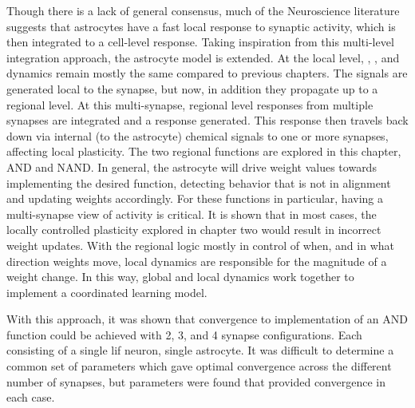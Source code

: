 Though there is a lack of general consensus, much of the Neuroscience literature
suggests that astrocytes have a fast local response to synaptic activity, which
is then integrated to a cell-level response. Taking inspiration from this
multi-level integration approach, the astrocyte model is extended. At the local
level, \ipt, \kp, and \ca dynamics remain mostly the same compared to previous
chapters. The \ca signals are generated local to the synapse, but now, in
addition they propagate up to a regional level. At this multi-synapse, regional
level \ca responses from multiple synapses are integrated and a response
generated. This response then travels back down via internal (to the astrocyte)
chemical signals to one or more synapses, affecting local plasticity. The two
regional functions are explored in this chapter, AND and NAND. In general, the
astrocyte will drive weight values towards implementing the desired function,
detecting behavior that is not in alignment and updating weights
accordingly. For these functions in particular, having a multi-synapse view of
activity is critical. It is shown that in most cases, the locally controlled
plasticity explored in chapter two would result in incorrect weight
updates. With the regional logic mostly in control of when, and in what
direction weights move, local dynamics are responsible for the magnitude of a
weight change. In this way, global and local dynamics work together to implement
a coordinated learning model.

With this approach, it was shown that convergence to implementation of an AND
function could be achieved with 2, 3, and 4 synapse configurations. Each
consisting of a single \gls{lif} neuron, single astrocyte. It was difficult to
determine a common set of parameters which gave optimal convergence across the
different number of synapses, but parameters were found that provided
convergence in each case.
